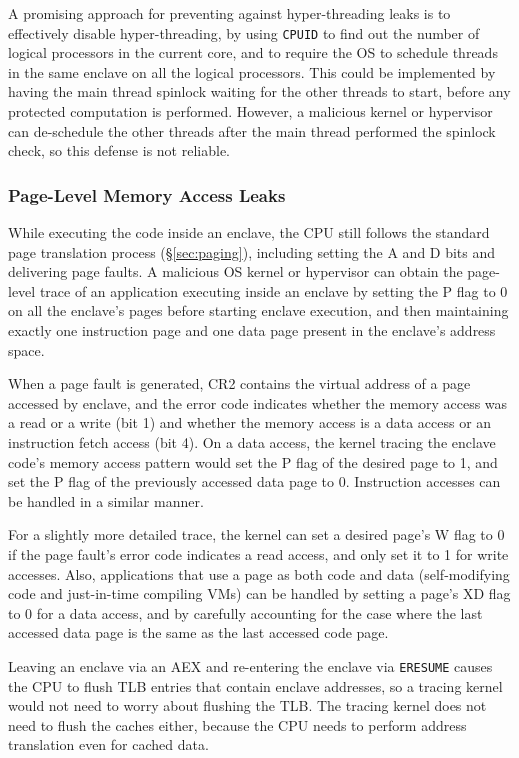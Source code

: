 A promising approach for preventing against hyper-threading leaks is to
effectively disable hyper-threading, by using \texttt{CPUID} to find out the
number of logical processors in the current core, and to require the OS to
schedule threads in the same enclave on all the logical processors. This could
be implemented by having the main thread spinlock waiting for the other threads
to start, before any protected computation is performed. However, a malicious
kernel or hypervisor can de-schedule the other threads after the main thread
performed the spinlock check, so this defense is not reliable.

\subsubsection{Page-Level Memory Access Leaks}

While executing the code inside an enclave, the CPU still follows the standard
page translation process (\S \ref{sec:paging}), including setting the A and D
bits and delivering page faults. A malicious OS kernel or hypervisor can
obtain the page-level trace of an application executing inside an enclave by
setting the P flag to 0 on all the enclave's pages before starting enclave
execution, and then maintaining exactly one instruction page and one data page
present in the enclave's address space.

When a page fault is generated, CR2 contains the virtual address of a page
accessed by enclave, and the error code indicates whether the memory access was
a read or a write (bit 1) and whether the memory access is a data access or
an instruction fetch access (bit 4). On a data access, the kernel tracing the
enclave code's memory access pattern would set the P flag of the desired page
to 1, and set the P flag of the previously accessed data page to 0. Instruction
accesses can be handled in a similar manner.

For a slightly more detailed trace, the kernel can set a desired page's W flag
to 0 if the page fault's error code indicates a read access, and only set it to
1 for write accesses. Also, applications that use a page as both code and data
(self-modifying code and just-in-time compiling VMs) can be handled by setting
a page's XD flag to 0 for a data access, and by carefully accounting for the
case where the last accessed data page is the same as the last accessed code
page.

Leaving an enclave via an AEX and re-entering the enclave via \texttt{ERESUME}
causes the CPU to flush TLB entries that contain enclave addresses, so a
tracing kernel would not need to worry about flushing the TLB. The tracing
kernel does not need to flush the caches either, because the CPU needs to
perform address translation even for cached data.

